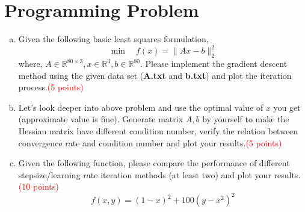 \documentclass[11pt, a4paper]{article}
\begin{document}
\section{Programming Problem}
\begin{enumerate}[(a)]
\item Given the following basic least squares formulation,
\begin{equation} 
	\min\quad f(x)=\|Ax-b\|_{2}^{2}
\end{equation}
where, $A \in \mathbb{R}^{80 \times 3}, x \in \mathbb{R}^{3}, b \in \mathbb{R}^{80}$. Please implement the gradient descent method using the given data set (\textbf{A.txt} and \textbf{b.txt}) and plot the iteration process.\textcolor{red}{(5 points)}  
\item Let's look deeper into above problem and use the optimal value of $x$ you get (approximate value is fine). Generate matrix $A,b$ by yourself to make the Hessian matrix have different condition number, verify the relation between convergence rate and condition number and plot your results.\textcolor{red}{(5 points)}
\item Given the following function, please compare the performance of different stepsize/learning rate iteration methods (at least two) and plot your results.\textcolor{red}{(10 points)}
$$ 
f(x, y)=(1-x)^{2}+100\left(y-x^{2}\right)^{2}
$$
\end{enumerate}
\end{document}
